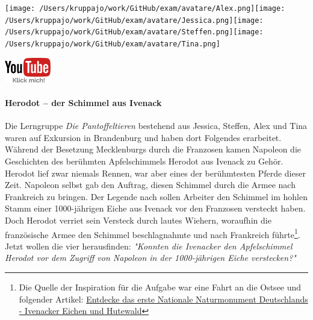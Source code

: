 \documentclass[a4paper, 9pt]{scrartcl}\usepackage[]{graphicx}\usepackage[]{xcolor}
\begin{document}
 
\begin{minipage}[t]{0.5\textwidth}
\texttt{[image: /Users/kruppajo/work/GitHub/exam/avatare/Alex.png]}\hspace{-4mm}\texttt{[image: /Users/kruppajo/work/GitHub/exam/avatare/Jessica.png]}\hspace{-4mm}\texttt{[image: /Users/kruppajo/work/GitHub/exam/avatare/Steffen.png]}\hspace{-4mm}\texttt{[image: /Users/kruppajo/work/GitHub/exam/avatare/Tina.png]}
\end{minipage}
\begin{minipage}[t]{0.5\textwidth}
\hfill
\href{https://youtu.be/Fu8kN0Uj13Y}{\includegraphics[width = 2cm]{img/youtube}}
\end{minipage}



\paragraph{Herodot – der Schimmel aus Ivenack}

Die Lerngruppe \textit{Die Pantoffeltieren} bestehend aus Jessica, Steffen, Alex und Tina waren auf Exkursion in Brandenburg und haben dort Folgendes erarbeitet. Während der Besetzung Mecklenburgs durch die Franzosen kamen Napoleon die Geschichten des berühmten Apfelschimmels Herodot aus Ivenack zu Gehör. Herodot lief zwar niemals Rennen, war aber eines der berühmtesten Pferde dieser Zeit. Napoleon selbst gab den Auftrag, diesen Schimmel durch die Armee nach Frankreich zu bringen. Der Legende nach sollen Arbeiter den Schimmel im hohlen Stamm einer 1000-jährigen Eiche aus Ivenack vor den Franzosen versteckt haben. Doch Herodot verriet sein Versteck durch lautes Wiehern, woraufhin die französische Armee den Schimmel beschlagnahmte und nach Frankreich führte\footnote{Die Quelle der Inspiration  für die Aufgabe war eine Fahrt an die Ostsee und folgender Artikel:
  \href{https://www.wald-mv.de/landingpage/ivenacker-eichen/}{Entdecke das erste Nationale Naturmonument Deutschlands - Ivenacker Eichen und Hutewald}}. Jetzt wollen die vier herausfinden: \textit{"Konnten die Ivenacker den Apfelschimmel Herodot vor dem Zugriff von Napoleon in der 1000-jährigen Eiche verstecken?"} 
\end{document}
